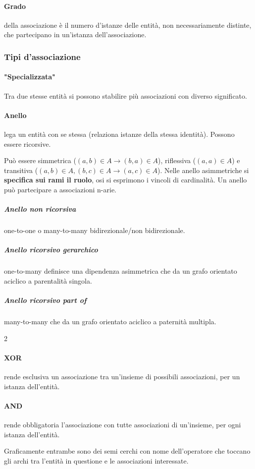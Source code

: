 \paragraph{Grado} della associazione è il numero d'istanze delle entità, non necessariamente distinte, che partecipano in un'istanza dell'associazione.
\subsubsection{Tipi d'associazione}
\paragraph{"Specializzata"}Tra due stesse entità si possono stabilire più associazioni con diverso significato.

\paragraph{Anello} lega un entità con se stessa (relaziona istanze della stessa identità).
Possono essere ricorsive.

Può essere simmetrica ($(a,b)\in A\to (b, a)\in A$), riflessiva ($(a,a)\in A$) e transitiva ($(a, b) \in A, (b, c)\in A\to (a,c)\in A$).
Nelle anello asimmetriche si \textbf{specifica sui rami il ruolo}, osi si esprimono i vincoli di cardinalità.
Un anello può partecipare a associazioni n-arie.

\subparagraph{Anello non ricorsiva} one-to-one o many-to-many bidirezionale/non bidirezionale.
\subparagraph{Anello ricorsivo gerarchico} one-to-many definisce una dipendenza asimmetrica che da un grafo orientato aciclico a parentalità singola.
\subparagraph{Anello ricorsivo part of} many-to-many che da un grafo orientato aciclico a paternità multipla.
\begin{paracol}{2}
	\paragraph{XOR} rende esclusiva un associazione tra un'insieme di possibili associazioni, per un istanza dell'entità.
	\switchcolumn
	\paragraph{AND} rende obbligatoria l'associazione con tutte associazioni di un'insieme, per ogni istanza dell'entità.
\end{paracol}

\medskip
Graficamente entrambe sono dei semi cerchi con nome dell'operatore che toccano gli archi tra l'entità in questione e le associazioni interessate.
